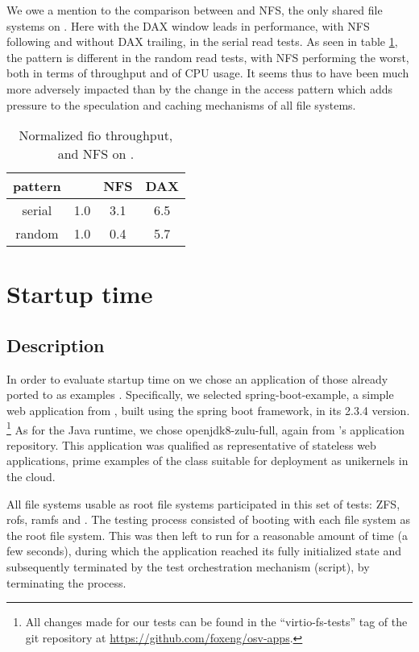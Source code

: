 We owe a mention to the comparison between \viofs{} and NFS, the only shared
file systems on \osv{}. Here \viofs{} with the DAX window leads in performance,
with NFS following and \viofs{} without DAX trailing, in the serial read tests.
As seen in table \ref{tab:fio-virtiofs-nfs}, the pattern is different in the
random read tests, with NFS performing the worst, both in terms of throughput
and of CPU usage. It seems thus to have been much more adversely impacted than
\viofs{} by the change in the access pattern which adds pressure to the
speculation and caching mechanisms of all file systems.

\begin{table}
    \centering
    \begin{tabular}{ |c|c|c|c| }
        \hline
        pattern & \viofs{} & NFS & \viofs{} DAX \\
        \hline
        serial & 1.0 & 3.1 & 6.5 \\
        random & 1.0 & 0.4 & 5.7 \\
        \hline
    \end{tabular}
    \caption{Normalized fio throughput, \viofs{} and NFS on \osv{}.}
    \label{tab:fio-virtiofs-nfs}
\end{table}

\section{Startup time}

\subsection{Description}

In order to evaluate startup time on \viofs{} we chose an application of those
already ported to \osv{} as examples \cite{osv-apps}. Specifically, we selected
spring-boot-example, a simple web application from \cite{spring-boot-examples},
built using the spring boot framework, %
in its 2.3.4 version.%
\footnote{All changes made for our tests can be found in the ``virtio-fs-tests''
tag of the git repository at \url{https://github.com/foxeng/osv-apps}.}
As for the Java runtime, we chose openjdk8-zulu-full, again from \osv{}'s
application repository. This application was qualified as representative of
stateless web applications, prime examples of the class suitable for deployment
as unikernels in the cloud.

All \osv{} file systems usable as root file systems participated in this set of
tests: ZFS, rofs, ramfs and \viofs{}. The testing process consisted of booting
\osv{} with each file system as the root file system. This was then left to run
for a reasonable amount of time (a few seconds), during which the application
reached its fully initialized state and subsequently terminated by the test
orchestration mechanism (script), by terminating the \qemu{} process.

